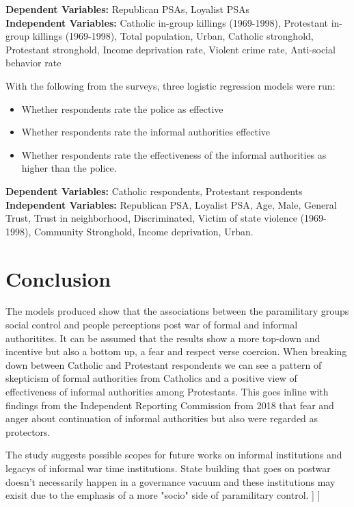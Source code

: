 \documentclass[12pt,letterpaper]{article}
\begin{document}
\textbf{Dependent Variables:} Republican PSAs, Loyalist PSAs \\
\textbf{Independent Variables:} Catholic in-group killings (1969-1998), Protestant in-group killings (1969-1998), Total population, Urban, Catholic stronghold, Protestant stronghold, Income deprivation rate, Violent crime rate, Anti-social behavior rate

With the following from the surveys, three logistic regression models were run:
\begin{itemize}
	\item Whether respondents rate the police as effective
	\item Whether respondents rate the informal authorities effective
	\item Whether respondents rate the effectiveness of the informal authorities as higher than the police.
\end{itemize}

\textbf{Dependent Variables:} Catholic respondents, Protestant respondents \\
\textbf{Independent Variables:} Republican PSA, Loyalist PSA, Age, Male, General Trust, Trust in neighborhood, Discriminated, Victim of state violence (1969-1998), Community Stronghold, Income deprivation, Urban.
\section*{Conclusion}
The models produced show that the associations between the paramilitary groups social control and people perceptions post war of formal and informal authoritites. It can be assumed that the results show a more top-down and incentive but also a bottom up, a fear and respect verse coercion. When breaking down between Catholic and Protestant respondents we can see a pattern of skepticism of formal authorities from Catholics and a positive view of effectiveness of informal authorities among Protestants. This goes inline with findings from the Independent Reporting Commission from 2018 that fear and anger about continuation of informal authorities but also were regarded as protectors. 

The study suggests possible scopes for future works on informal institutions and legacys of informal war time institutions. State building that goes on postwar doesn't necessarily happen in a governance vacuum and these institutions may exisit due to the emphasis of a more "socio" side of paramilitary control. 
	]
		]
\end{document}
